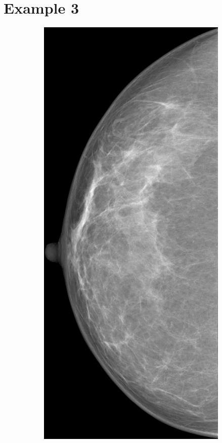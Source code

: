 \newpage
\section{Example 3}
\begin{figure}[h]
	\centering
	\begin{subfigure}{0.2\textwidth}
		\centering
			\includegraphics[width=\textwidth]{plots/examples/mammogram_3.png}

\end{subfigure}
\end{figure}
